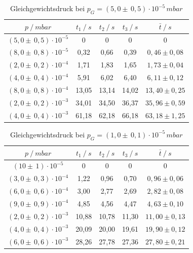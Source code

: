 \begin{table}[H]
\centering
\begin{tabular}{c|c|c|c|c}
	{$p \:/\: \si{mbar}$} & {$t_1 \:/\: \si{s} $} & {$t_2 \:/\: \si{s} $} & {$t_3 \:/\: \si{s} $} & {$\bar{t} \:/\: \si{s}$}\\
\midrule
$(5,0 \pm \, 0,5)\cdot 10^{-5}$ &0 &0 &0 &0\\
$(8,0 \pm \, 0,8)\cdot 10^{-5}$ &   0,32 &  0,66 &  0,39 & $0,46 \pm 0,08$\\
$(2,0 \pm \, 0,2)\cdot 10^{-4}$ &   1,71  &  1,83 &  1,65 & $1,73 \pm 0,04 $\\
$(4,0 \pm \, 0,4)\cdot 10^{-4}$ &   5,91 &  6,02 &  6,40 & $6,11 \pm 0,12 $\\
$(8,0 \pm \, 0,8)\cdot 10^{-4}$ &   13,05 &  13,14 &  14,02 & $13,40 \pm 0,25 $\\
$(2,0 \pm \, 0,2)\cdot 10^{-3}$ &   34,01 &  34,50 &  36,37 & $35,96 \pm 0,59 $\\
$(4,0 \pm \, 0,4)\cdot 10^{-3}$ &  61,18 & 62,18 & 66,18 & $63,18 \pm 1,25 $\\
\end{tabular}
\caption{Gleichgewichtsdruck bei $p_G=(5,0 \pm \, 0,5)\cdot 10^{-5} \, \si{mbar}$}
\label{tab:leck_Turbo1}
\end{table}

\begin{table}[H]
\centering
\begin{tabular}{c|c|c|c|c}
	{$p \:/\: \si{mbar}$} & {$t_1 \:/\: \si{s} $} & {$t_2 \:/\: \si{s} $} & {$t_3 \:/\: \si{s} $} & {$\bar{t} \:/\: \si{s}$}\\
\midrule
$(10 \pm \, 1)\cdot 10^{-5}$ &0 &0 &0 &0\\
$(3,0 \pm \, 0,3)\cdot 10^{-4}$ &   1,22 &  0,96 &  0,70 & $0,96 \pm 0,06$\\
$(6,0 \pm \, 0,6)\cdot 10^{-4}$ &   3,00  &  2,77 &  2,69 & $2,82 \pm 0,08 $\\
$(9,0 \pm \, 0,9)\cdot 10^{-4}$ &   4,85 &  4,56 &  4,47 & $4,63 \pm 0,10 $\\
$(2,0 \pm \, 0,2)\cdot 10^{-3}$ &   10,88 &  10,78 &  11,30 & $11,00 \pm 0,13 $\\
$(4,0 \pm \, 0,4)\cdot 10^{-3}$ &   20,09 &  20,00 &  19,61 & $19,90 \pm 0,12 $\\
$(6,0 \pm \, 0,6)\cdot 10^{-3}$ &  28,26 & 27,78 & 27,36 & $27,80 \pm 0,21 $\\
\end{tabular}
\caption{Gleichgewichtsdruck bei $p_G=(1,0 \pm \, 0,1)\cdot 10^{-5} \, \si{mbar}$}
\label{tab:leck_Turbo2}
\end{table}

